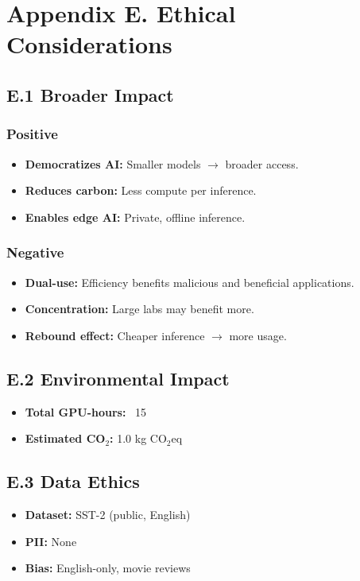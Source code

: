 
\section{Appendix E. Ethical Considerations}

\subsection{E.1 Broader Impact}

\subsubsection{Positive}
\begin{itemize}
\item \textbf{Democratizes AI:} Smaller models $\to$ broader access.
\item \textbf{Reduces carbon:} Less compute per inference.
\item \textbf{Enables edge AI:} Private, offline inference.

\end{itemize}
\subsubsection{Negative}
\begin{itemize}
\item \textbf{Dual-use:} Efficiency benefits malicious and beneficial applications.
\item \textbf{Concentration:} Large labs may benefit more.
\item \textbf{Rebound effect:} Cheaper inference $\to$ more usage.

\end{itemize}
\subsection{E.2 Environmental Impact}

\begin{itemize}
\item \textbf{Total GPU-hours:} ~15
\item \textbf{Estimated CO$_2$:} 1.0 kg CO$_2$eq

\end{itemize}
\subsection{E.3 Data Ethics}

\begin{itemize}
\item \textbf{Dataset:} SST-2 (public, English)
\item \textbf{PII:} None
\item \textbf{Bias:} English-only, movie reviews

\end{itemize}
